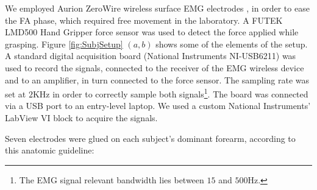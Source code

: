 \documentclass[10pt]{bmc_article}
\def\texttt{[image: ]}
\newenvironment{bmcformat}{\begin{raggedright}\baselineskip20pt\sloppy\setboolean{publ}{false}}{\end{raggedright}\baselineskip20pt\sloppy}
\begin{document}
\begin{bmcformat}

We employed Aurion ZeroWire wireless surface EMG
electrodes \cite{zerowire}, in order to ease the FA
phase, which required free movement in the laboratory. A FUTEK LMD500
Hand Gripper force sensor \cite{LMD500} was used to detect the
force applied while grasping. Figure \ref{fig:SubjSetup} $(a,b)$ shows some of the
elements of the setup. A standard digital acquisition board
(National Instruments NI-USB6211) was used to record the signals,
connected to the receiver of the EMG wireless device and to an
amplifier, in turn connected to the force sensor. The sampling rate was set at
$2$KHz in order to correctly sample both signals\footnote{The EMG signal
relevant bandwidth lies between $15$ and $500$Hz.}. The board was connected via a
USB port to an entry-level laptop. We used a custom National
Instruments' LabView VI block to acquire the signals.


Seven electrodes were glued on each subject's dominant
forearm, according to this anatomic guideline:

\begin{itemize}


\end{itemize}
\end{bmcformat}
\end{document}

